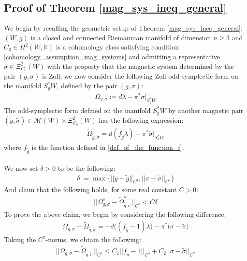 \documentclass[11pt]{amsart}
\theoremstyle{plain}
\theoremstyle{definition}
\theoremstyle{remark}
\begin{document}
\subsection{Proof of Theorem \ref{mag_sys_ineq_general}}\label{mag_sys_ineq_general_proof}
We begin by recalling the geometric setup of Theorem \ref{mag_sys_ineq_general}: $(W,g)$ is a closed and connected Riemannian manifold of dimension $n\geq 3$ and $C_0 \in H^2(W,\mathbb{R})$ is a cohomology class satisfying condition \eqref{cohomology_assumption_mag_systems} and admitting a representative $\sigma \in \Xi^2_{C_0}(W)$ with the property that the magnetic system determined by the pair $(g,\sigma)$ is Zoll; we now consider the following Zoll odd-symplectic form on the manifold $S_g^*W$, defined by the pair $(g,\sigma)$:
\begin{align*}
    \Omega_{g,\sigma} := d\lambda - \pi^*\sigma\big\vert_{S^*_gW}
\end{align*}
The odd-symplectic form defined on the manifold $S^*_gW$ by another magnetic pair $(\tilde g,\tilde \sigma) \in \mathcal{M}(W) \times \Xi^2_{C_0}(W)$ has the following expression:
\begin{align}
    \tilde \Omega_{\tilde g,\tilde \sigma}= d(f_{\tilde g}\lambda)-\pi^*\tilde\sigma \big\vert_{S_g^*W}
\end{align}
where $f_{\tilde g}$ is the function defined in \eqref{def_of_the_function_f}.\\
\\
We now set $\delta>0$ to be the following:
\begin{align}\label{def_delta_mag_ineq_gen}
\delta:=  \max\{\vert \vert g - \tilde g\vert\vert_{C^3}, \vert\vert \sigma -\tilde \sigma\vert\vert_{C^3}\}
\end{align}
And claim that the following holds, for some real constant $C>0$:
\begin{align}\label{mag_ineq_gen_1}
    \big\vert\big\vert \Omega^{s}_{g,\sigma} -  \tilde \Omega^{s}_{\tilde g,\tilde \sigma}\big\vert\big\vert_{C^2} < C\delta
\end{align}
To prove the above claim, we begin by considering the following difference:
\begin{align}
     \Omega_{g,\sigma} -  \tilde \Omega_{\tilde g,\tilde \sigma} = -d\big( (f_{\tilde g} -1) \lambda\big) - \pi^*\big(\sigma -\tilde \sigma\big)
\end{align}
Taking the $C^2$-norms, we obtain the following:
\begin{align}
    \big\vert\big\vert \Omega_{g,\sigma} -  \tilde \Omega_{\tilde g,\tilde \sigma}\big\vert\big\vert_{C^2} \leq C_1 \big\vert\big\vert f_{\tilde g}-1\big\vert\big\vert_{C^3} + C_2 \big\vert\big\vert \sigma -\tilde \sigma\big\vert\big\vert_{C^2}
\end{align}
\end{document}
